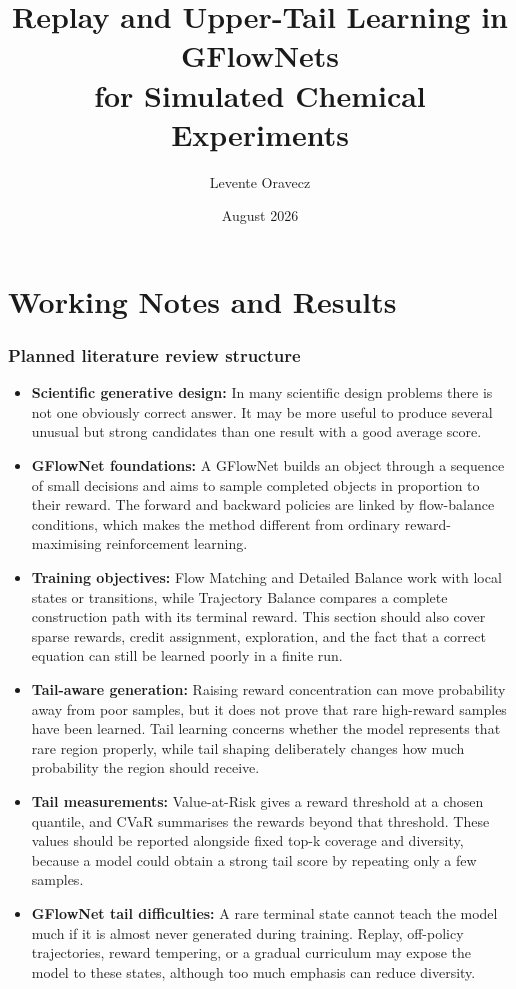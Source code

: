 \documentclass{article}
\title{Replay and Upper-Tail Learning in GFlowNets\\for Simulated Chemical Experiments}
\author{Levente Oravecz}
\date{August 2026}
\begin{document}
\maketitle
\clearpage
\tableofcontents
\clearpage

\iffalse
\part{Working Notes and Results}

\section{Planned literature review structure}
\begin{itemize}
    \item \textbf{Scientific generative design:} In many scientific design problems there is not one obviously correct answer. It may be more useful to produce several unusual but strong candidates than one result with a good average score.
    \item \textbf{GFlowNet foundations:} A GFlowNet builds an object through a sequence of small decisions and aims to sample completed objects in proportion to their reward. The forward and backward policies are linked by flow-balance conditions, which makes the method different from ordinary reward-maximising reinforcement learning.
    \item \textbf{Training objectives:} Flow Matching and Detailed Balance work with local states or transitions, while Trajectory Balance compares a complete construction path with its terminal reward. This section should also cover sparse rewards, credit assignment, exploration, and the fact that a correct equation can still be learned poorly in a finite run.
    \item \textbf{Tail-aware generation:} Raising reward concentration can move probability away from poor samples, but it does not prove that rare high-reward samples have been learned. Tail learning concerns whether the model represents that rare region properly, while tail shaping deliberately changes how much probability the region should receive.
    \item \textbf{Tail measurements:} Value-at-Risk gives a reward threshold at a chosen quantile, and CVaR summarises the rewards beyond that threshold. These values should be reported alongside fixed top-k coverage and diversity, because a model could obtain a strong tail score by repeating only a few samples.
    \item \textbf{GFlowNet tail difficulties:} A rare terminal state cannot teach the model much if it is almost never generated during training. Replay, off-policy trajectories, reward tempering, or a gradual curriculum may expose the model to these states, although too much emphasis can reduce diversity.

\end{itemize}
\end{document}
